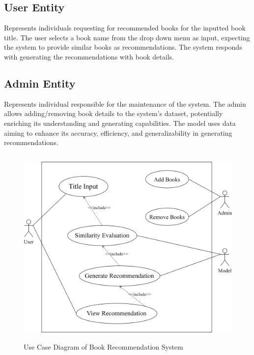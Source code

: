 \subsection*{User Entity}
Represents individuals requesting for recommended books for the inputted book title. The user selects a book name from the drop down menu as input,
expecting the system to provide similar books as recommendations. The system
responds with generating the recommendations with book details.

\subsection*{Admin Entity}
Represents individual responsible for the maintenance of the system. The admin
allows adding/removing book details to the system's dataset, potentially
enriching its understanding and generating capabilities. The model uses data aiming to enhance its accuracy,
efficiency, and generalizability in generating recommendations.
\begin{figure}[h]
    \centering
    \includegraphics[width=1\linewidth, height=10cm]{img/Graphics/Use Case BRS.drawio.png}
    \caption{Use Case Diagram of Book Recommendation System}
    \label{Usecase}
\end{figure}
\newpage

